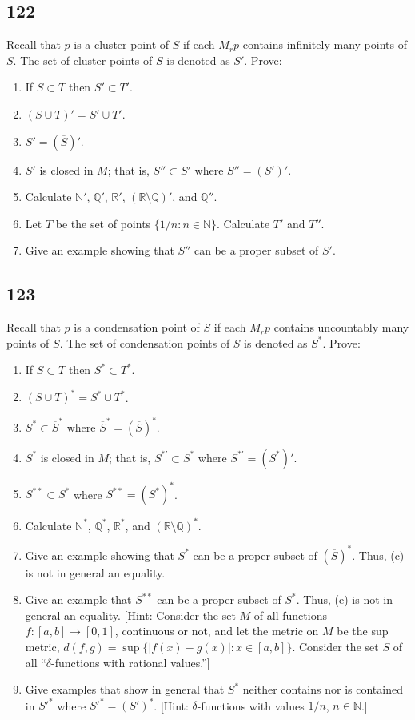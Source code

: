 \documentclass{amsart}
\begin{document}
\subsection*{122}
Recall that $p$ is a cluster point of $S$ if each $M_r p$ contains infinitely many points of $S$. The set of cluster points of $S$ is denoted as $S'$. Prove:
\begin{enumerate}[label=(\alph*)]
\item If $S \subset T$ then $S' \subset T'$.
\item $(S \cup T)' = S' \cup T'$.
\item $S' = (\overline{S})'$.
\item $S'$ is closed in $M$; that is, $S'' \subset S'$ where $S'' = (S')'$.
\item Calculate $\mathbb{N}'$, $\mathbb{Q}'$, $\mathbb{R}'$, $(\mathbb{R}\setminus\mathbb{Q})'$, and $\mathbb{Q}''$.
\item Let $T$ be the set of points $\{1/n : n \in \mathbb{N}\}$. Calculate $T'$ and $T''$.
\item Give an example showing that $S''$ can be a proper subset of $S'$.
\end{enumerate}

\subsection*{123}
Recall that $p$ is a condensation point of $S$ if each $M_r p$ contains uncountably many points of $S$. The set of condensation points of $S$ is denoted as $S^*$. Prove:
\begin{enumerate}[label=(\alph*)]
\item If $S \subset T$ then $S^* \subset T^*$.
\item $(S \cup T)^* = S^* \cup T^*$.
\item $S^* \subset \overline{S}^*$ where $\overline{S}^* = (\overline{S})^*$.
\item $S^*$ is closed in $M$; that is, $S^{*\prime} \subset S^*$ where $S^{*\prime} = (S^*)'$.
\item $S^{**} \subset S^*$ where $S^{**} = (S^*)^*$.
\item Calculate $\mathbb{N}^*$, $\mathbb{Q}^*$, $\mathbb{R}^*$, and $(\mathbb{R}\setminus\mathbb{Q})^*$.
\item Give an example showing that $S^*$ can be a proper subset of $(\overline{S})^*$. Thus, (c) is not in general an equality.
\item[**(h)] Give an example that $S^{**}$ can be a proper subset of $S^*$. Thus, (e) is not in general an equality. [Hint: Consider the set $M$ of all functions $f : [a,b] \to [0,1]$, continuous or not, and let the metric on $M$ be the sup metric, $d(f,g) = \sup\{|f(x)-g(x)| : x \in [a,b]\}$. Consider the set $S$ of all ``$\delta$-functions with rational values.'']
\item[**(i)] Give examples that show in general that $S^*$ neither contains nor is contained in $S'^*$ where $S'^* = (S')^*$. [Hint: $\delta$-functions with values $1/n$, $n \in \mathbb{N}$.]
\end{enumerate}
\end{document}
